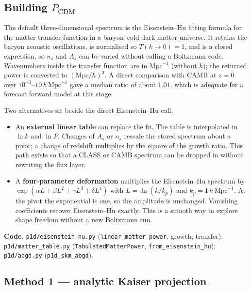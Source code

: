 \documentclass[11pt]{article}
\begin{document}
\subsection{Building $P_\mathrm{CDM}$}

The default three-dimensional spectrum is the Eisenstein--Hu fitting formula for the matter transfer function in a baryon--cold-dark-matter universe.
It retains the baryon acoustic oscillations, is normalised so $T(k\to 0)=1$, and is a closed expression, so $n_s$ and $A_s$ can be varied without calling a Boltzmann code.
Wavenumbers inside the transfer function are in $\mathrm{Mpc}^{-1}$ (without $h$); the returned power is converted to $(\mathrm{Mpc}/h)^{3}$.
A direct comparison with CAMB at $z=0$ over $10^{-3}$--$10\,h\,\mathrm{Mpc}^{-1}$ gave a median ratio of about $1.01$, which is adequate for a forecast forward model at this stage.

Two alternatives sit beside the direct Eisenstein--Hu call.
\begin{itemize}
\item An \textbf{external linear table} can replace the fit.
The table is interpolated in $\ln k$ and $\ln P$.
Changes of $A_s$ or $n_s$ rescale the stored spectrum about a pivot; a change of redshift multiplies by the square of the growth ratio.
This path exists so that a CLASS or CAMB spectrum can be dropped in without rewriting the flux layer.
\item A \textbf{four-parameter deformation} multiplies the Eisenstein--Hu spectrum by
$\exp(\alpha L+\beta L^{2}+\gamma L^{3}+\delta L^{4})$ with $L=\ln(k/k_p)$ and $k_p=1\,h\,\mathrm{Mpc}^{-1}$.
At the pivot the exponential is one, so the amplitude is unchanged.
Vanishing coefficients recover Eisenstein--Hu exactly.
This is a smooth way to explore shape freedom without a new Boltzmann run.
\end{itemize}

\textbf{Code.}
\texttt{p1d/eisenstein\_hu.py} (\texttt{linear\_matter\_power}, growth, transfer);
\texttt{p1d/matter\_table.py} (\texttt{TabulatedMatterPower}, \texttt{from\_eisenstein\_hu});
\texttt{p1d/abgd.py} (\texttt{p1d\_skm\_abgd}).

\subsection{Method 1 --- analytic Kaiser projection}
\end{document}

